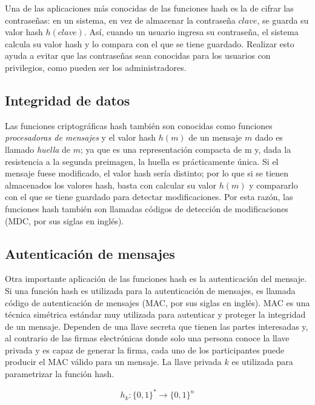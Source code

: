 Una de las aplicaciones más conocidas de las funciones hash es la de
cifrar las contraseñas: en un sistema, en vez de almacenar la contraseña
$clave$, se guarda su valor hash $h(clave)$. Así, cuando un usuario
ingresa su contraseña, el sistema calcula su valor hash y lo compara con
el que se tiene guardado. Realizar esto ayuda a evitar que las
contraseñas sean conocidas para los usuarios con privilegios, como
pueden ser los administradores.

\subsection{Integridad de datos}
Las funciones criptográficas hash también son conocidas como funciones
\textit{procesadoras de mensajes} y el valor hash $h(m)$ de un mensaje
$m$ dado es llamado \textit{huella} de $m$; ya que es una representación
compacta de m y, dada la resistencia a la segunda preimagen, la huella
es prácticamente única. Si el mensaje fuese modificado, el valor hash
sería distinto; por lo que si se tienen almacenados los valores hash,
basta con calcular su valor $h(m)$ y compararlo con el que se tiene
guardado para detectar modificaciones. Por esta razón, las funciones
hash también son llamadas códigos de detección de modificaciones (MDC,
por sus siglas en inglés).

\subsection{Autenticación de mensajes}
Otra importante aplicación de las funciones hash es la autenticación
del mensaje. Si una función hash es utilizada para la autenticación de
mensajes, es llamada código de autenticación de mensajes (MAC, por sus
siglas en inglés). MAC es una técnica simétrica estándar muy utilizada
para autenticar y proteger la integridad de un mensaje. Dependen de
una llave secreta que tienen las partes interesadas y, al contrario de
las firmas electrónicas donde solo una persona conoce la llave privada
y es capaz de generar la firma, cada uno de los participantes puede
producir el MAC válido para un mensaje. La llave privada $k$ es
utilizada para parametrizar la función hash.

\begin{equation}
  \label{funcion_hash_mac}
  h_k: \{0, 1\}^* \longrightarrow \{0,1\}^n
\end{equation}

